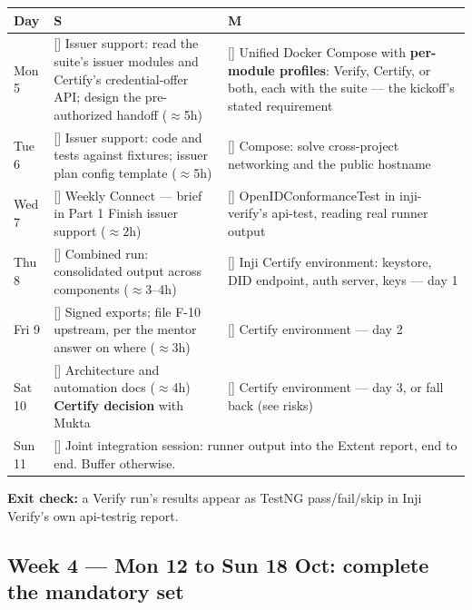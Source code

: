 \documentclass[10pt,a4paper]{article}
\newcommand{\todo}{[\phantom{x}]}
\newcommand{\Sh}{\textbf{S}}
\newcommand{\Mu}{\textbf{M}}
\begin{document}
\begin{longtable}{@{}p{1.9cm}p{6.9cm}p{7.2cm}@{}}
\toprule
Day & \Sh & \Mu\\
\midrule
\endhead
Mon 5 & \todo{} Issuer support: read the suite's issuer modules and Certify's credential-offer
API; design the pre-authorized handoff ($\approx$5h) & \todo{} Unified Docker Compose with \textbf{per-module profiles}: Verify, Certify,
or both, each with the suite --- the kickoff's stated requirement\\
\addlinespace
Tue 6 & \todo{} Issuer support: code and tests against fixtures; issuer plan config
template ($\approx$5h)
& \todo{} Compose: solve cross-project networking and the public hostname\\
\addlinespace
Wed 7 & \todo{} Weekly Connect --- brief in Part 1\newline
\todo{} Finish issuer support ($\approx$2h)
& \todo{} OpenIDConformanceTest in inji-verify's api-test, reading real runner
output\\
\addlinespace
Thu 8 & \todo{} Combined run: consolidated output across components ($\approx$3--4h)
& \todo{} Inji Certify environment: keystore, DID endpoint, auth server, keys --- day 1\\
\addlinespace
Fri 9 & \todo{} Signed exports; file F-10 upstream, per the mentor answer on where ($\approx$3h)
& \todo{} Certify environment --- day 2\\
\addlinespace
Sat 10 & \todo{} Architecture and automation docs ($\approx$4h)\newline
\todo{} \textbf{Certify decision} with Mukta
& \todo{} Certify environment --- day 3, or fall back (see risks)\\
\addlinespace
Sun 11 & \multicolumn{2}{p{14.2cm}}{\todo{} Joint integration session: runner output into the Extent
report, end to end. Buffer otherwise.}\\
\bottomrule
\end{longtable}

\textbf{Exit check:} a Verify run's results appear as TestNG pass/fail/skip in Inji
Verify's own api-testrig report.

\subsection{Week 4 --- Mon 12 to Sun 18 Oct: complete the mandatory set}
\end{document}
